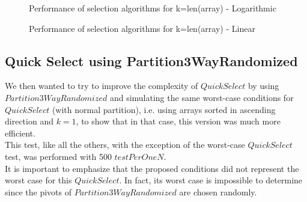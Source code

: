 \documentclass{article}
\begin{document}
\begin{figure}[H]   
  \caption{Performance of selection algorithms for k=len(array) - Logarithmic}
\end{figure}

\begin{figure}[H]   
  \caption{Performance of selection algorithms for k=len(array) - Linear}
\end{figure}

\subsection{Quick Select using Partition3WayRandomized}
We then wanted to try to improve the complexity of $QuickSelect$ by using $Partition3WayRandomized$ and simulating the same worst-case conditions for $QuickSelect$ (with normal partition), i.e. using arrays sorted in ascending direction and $k=1$, to show that in that case, this version was much more efficient.\\
This test, like all the others, with the exception of the worst-case $QuickSelect$ test, was performed with 500 $testPerOneN$. \\
It is important to emphasize that the proposed conditions did not represent the worst case for this $QuickSelect$. In fact, its worst case is impossible to determine since the pivots of $Partition3WayRandomized$ are chosen randomly.\\
\end{document}
